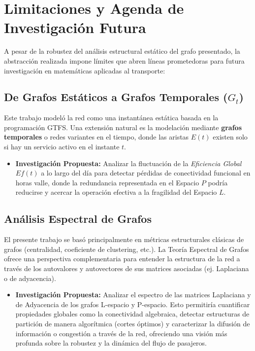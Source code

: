 \section{Limitaciones y Agenda de Investigación Futura}

A pesar de la robustez del análisis estructural estático del grafo presentado, la abstracción realizada impone límites que abren líneas prometedoras para futura investigación en matemáticas aplicadas al transporte:

\subsection{De Grafos Estáticos a Grafos Temporales ($G_t$)}
Este trabajo modeló la red como una instantánea estática basada en la programación GTFS. Una extensión natural es la modelación mediante \textbf{grafos temporales} o redes variantes en el tiempo, donde las aristas $E(t)$ existen solo si hay un servicio activo en el instante $t$.
\begin{itemize}
    \item \textbf{Investigación Propuesta:} Analizar la fluctuación de la \textit{Eficiencia Global} $Ef(t)$ a lo largo del día para detectar pérdidas de conectividad funcional en horas valle, donde la redundancia representada en el Espacio $P$ podría reducirse y acercar la operación efectiva a la fragilidad del Espacio $L$.
\end{itemize}

\subsection{Análisis Espectral de Grafos}
El presente trabajo se basó principalmente en métricas estructurales clásicas de grafos (centralidad, coeficiente de clustering, etc.). La Teoría Espectral de Grafos ofrece una perspectiva complementaria para entender la estructura de la red a través de los autovalores y autovectores de sus matrices asociadas (ej. Laplaciana o de adyacencia).
\begin{itemize}
    \item \textbf{Investigación Propuesta:} Analizar el espectro de las matrices Laplaciana y de Adyacencia de los grafos L-espacio y P-espacio. Esto permitiría cuantificar propiedades globales como la conectividad algebraica, detectar estructuras de partición de manera algorítmica (cortes óptimos) y caracterizar la difusión de información o congestión a través de la red, ofreciendo una visión más profunda sobre la robustez y la dinámica del flujo de pasajeros.
\end{itemize}

